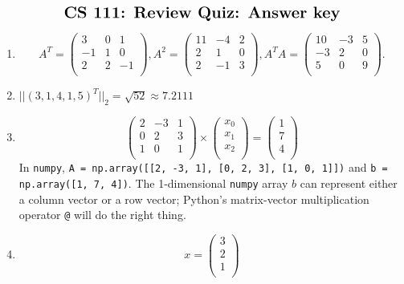 \documentclass[11pt]{article}
\newcommand{\numpy}{{\tt numpy}}    %
\begin{document}
$$\mbox{\Large \bf CS 111: Review Quiz: Answer key} $$

\medskip


\begin{enumerate}

\item
$$ 
A^T = \left(
\begin{array}{ccc}
3 & 0 & 1 \\ 	
-1 & 1 & 0 \\ 
2 & 2 & -1 \\
\end{array} 
\right),
A^2 = \left(
\begin{array}{ccc}
11 & -4 & 2 \\
2 & 1 & 0 \\ 
2 & -1 & 3 \\
\end{array} 
\right),
A^TA = \left(
\begin{array}{ccc}
10 & -3 & 5 \\
-3 & 2 & 0 \\
5 & 0 & 9 \\
\end{array} 
\right).
$$

\item
$||(3,1,4,1,5)^T||_2 = \sqrt{52} \approx 7.2111$

\item
$$
\left(
\begin{array}{ccc}
2 & -3 & 1 \\
0 & 2 & 3 \\ 
1 & 0 & 1 \\
\end{array} 
\right) 
\times
\left(
\begin{array}{c}
 x_0 \\
 x_1 \\ 
 x_2 \\
\end{array} 
\right) 
=
\left(
\begin{array}{c}
 1 \\
 7 \\ 
 4 \\
\end{array} 
\right) 
$$
In \numpy, {\tt A = np.array([[2, -3, 1], [0, 2, 3], [1, 0, 1]])}
and {\tt b = np.array([1, 7, 4])}.
The 1-dimensional {\tt numpy} array $b$ can represent either a
column vector or a row vector; Python's matrix-vector multiplication
operator {\tt @} will do the right thing.

\item
$$x = 
\left(
\begin{array}{c}
 3 \\
 2 \\ 
 1 \\
\end{array} 
\right) 
$$


\end{enumerate}
\end{document}
